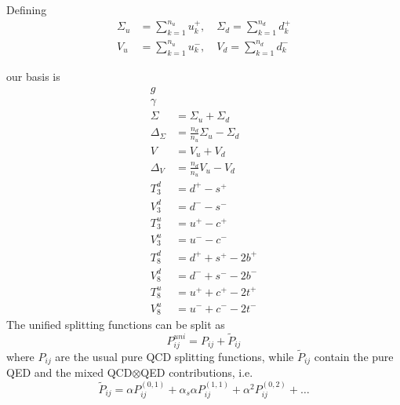 \documentclass[a4paper,twoside]{article}
\title{}
\author{}
\date{}
\begin{document}
Defining
\begin{align*}
\Sigma_u&=\sum_{k=1}^{n_u}u_k^+,  \quad \Sigma_d=\sum_{k=1}^{n_d}d_k^+ \\
V_u&=\sum_{k=1}^{n_u}u_k^-, \quad V_d=\sum_{k=1}^{n_d}d_k^-
\end{align*}

our basis is
\begin{align*}
g & \\
\gamma & \\
\Sigma &= \Sigma_u + \Sigma_d \\
\Delta_\Sigma & = \frac{n_d}{n_u}\Sigma_u - \Sigma_d \\
V & = V_u + V_d \\
\Delta_V & = \frac{n_d}{n_u}V_u - V_d \\
T_3^d &=d^+ - s^+ \\
V_3^d &=d^- - s^- \\
T_3^u &=u^+ - c^+ \\
V_3^u &=u^- - c^- \\
T_8^d &=d^+ + s^+ - 2b^+ \\
V_8^d &=d^- + s^- - 2b^- \\
T_8^u &=u^+ + c^+ - 2t^+ \\
V_8^u &=u^- + c^- - 2t^-
\end{align*}
The unified splitting functions can be split as
\begin{equation*}
P^{uni}_{ij} = P_{ij}+\tilde{P}_{ij}
\end{equation*}
where $P_{ij}$ are the usual pure QCD splitting functions, while $\tilde{P}_{ij}$ contain the pure QED and the mixed QCD$\otimes$QED contributions, i.e.\
\begin{equation*}
\tilde{P}_{ij} = \alpha P^{(0,1)}_{ij} +\alpha_s \alpha P^{(1,1)}_{ij} + \alpha^2 P^{(0,2)}_{ij} + \dots
\end{equation*}
\end{document}
